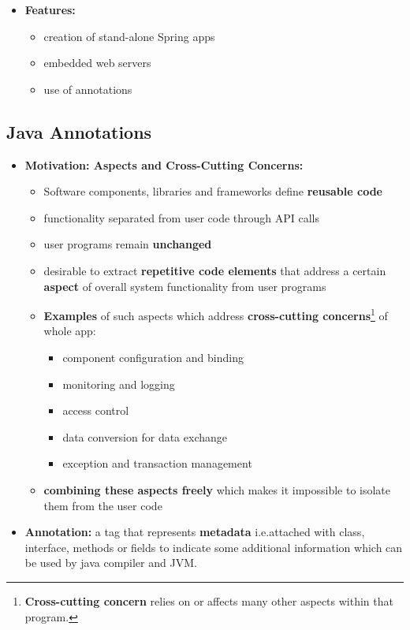 \documentclass[ieeetran]{article}
\begin{document}
\begin{itemize}
\begin{itemize}
	\item \textbf{Features:}
		\begin{itemize}
		  \item creation of stand-alone Spring apps
		\item embedded web servers
		\item use of annotations
		\end{itemize}
	\end{itemize}
\end{itemize}

\subsection{Java Annotations} %
\label{sub:java_annotations}

\begin{itemize}
  \item \textbf{Motivation: Aspects and Cross-Cutting Concerns:}
	  \begin{itemize}
	    \item Software components, libraries and frameworks define \textbf{reusable code}
\item functionality separated from user code through API calls
\item user programs remain \textbf{unchanged}
\item desirable to extract \textbf{repetitive code elements} that address a certain \textbf{aspect} of overall system functionality from user programs
\item \textbf{Examples} of such aspects which address \textbf{cross-cutting concerns}\footnote{\textbf{Cross-cutting concern} relies on or affects many other aspects within that program.} of whole app:
	\begin{itemize}
	  \item component configuration and binding
	\item monitoring and logging
		\item access control
			\item data conversion for data exchange
			\item exception and transaction management
	\end{itemize}

\item \textbf{combining these aspects freely} which makes it impossible to isolate them from the user code
	  \end{itemize}

  \item \textbf{Annotation:} a tag that represents \textbf{metadata} i.e.\@  attached with class, interface, methods or fields to indicate some additional information which can be used by java compiler and JVM.


\end{itemize}
\end{document}
